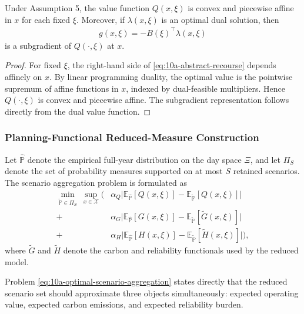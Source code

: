 \begin{proposition}
Under Assumption 5, the value function \(Q(x,\xi)\) is convex and piecewise affine in \(x\) for each fixed \(\xi\). Moreover, if \(\lambda(x,\xi)\) is an optimal dual solution, then
\begin{align}
g(x,\xi) = -B(\xi)^\top \lambda(x,\xi)
\label{eq:10a-dual-subgradient}
\end{align}
is a subgradient of \(Q(\cdot,\xi)\) at \(x\).
\end{proposition}

\begin{proof}
For fixed \(\xi\), the right-hand side of \eqref{eq:10a-abstract-recourse} depends affinely on \(x\). By linear programming duality, the optimal value is the pointwise supremum of affine functions in \(x\), indexed by dual-feasible multipliers. Hence \(Q(\cdot,\xi)\) is convex and piecewise affine. The subgradient representation follows directly from the dual value function.
\end{proof}

\subsubsection{Planning-Functional Reduced-Measure Construction}

Let \(\widehat{\mathbb{P}}\) denote the empirical full-year distribution on the day space \(\Xi\), and let \(\Pi_S\) denote the set of probability measures supported on at most \(S\) retained scenarios. The scenario aggregation problem is formulated as
\begin{align}
\min_{\widetilde{\mathbb{P}}\in\Pi_S}\ \sup_{x\in\mathcal{X}} \Bigg(
&\alpha_Q \big|\mathbb{E}_{\widehat{\mathbb{P}}}[Q(x,\xi)]-\mathbb{E}_{\widetilde{\mathbb{P}}}[Q(x,\xi)]\big| \\
+&\alpha_G \big|\mathbb{E}_{\widehat{\mathbb{P}}}[G(x,\xi)]-\mathbb{E}_{\widetilde{\mathbb{P}}}[\widetilde G(x,\xi)]\big| \\
+&\alpha_H \big|\mathbb{E}_{\widehat{\mathbb{P}}}[H(x,\xi)]-\mathbb{E}_{\widetilde{\mathbb{P}}}[\widetilde H(x,\xi)]\big|
\Bigg),
\label{eq:10a-optimal-scenario-aggregation}
\end{align}
where \(\widetilde G\) and \(\widetilde H\) denote the carbon and reliability functionals used by the reduced model.

Problem \eqref{eq:10a-optimal-scenario-aggregation} states directly that the reduced scenario set should approximate three objects simultaneously: expected operating value, expected carbon emissions, and expected reliability burden.

